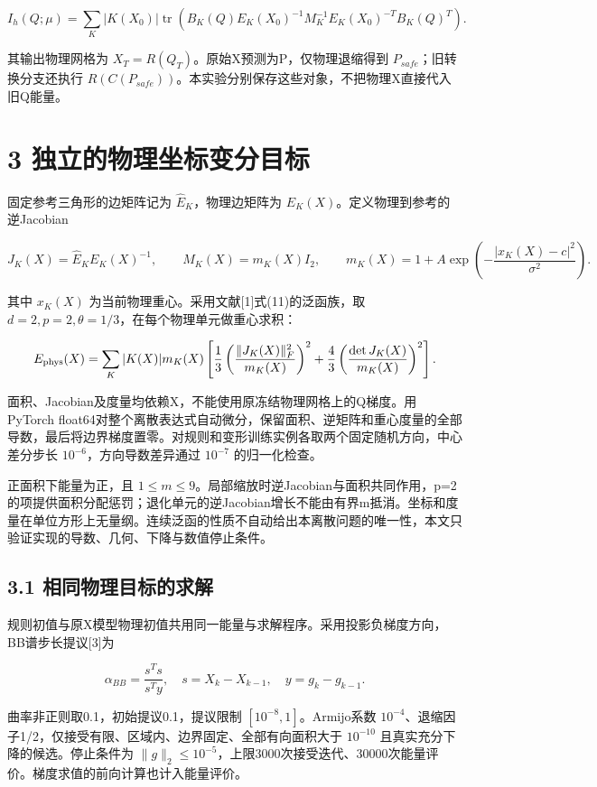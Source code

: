 \documentclass[UTF8,a4paper,zihao=5,fontset=fandol]{ctexart}
\begin{document}
\[
I_h(Q;\mu)=\sum_K |K(X_0)|\operatorname{tr}
\left(B_K(Q)E_K(X_0)^{-1}M_K^{-1}E_K(X_0)^{-T}B_K(Q)^T\right).
\]

其输出物理网格为 $X_T=R(Q_T)$。原始X预测为P，仅物理退缩得到 $P_{safe}$；旧转换分支还执行 $R(C(P_{safe}))$。本实验分别保存这些对象，不把物理X直接代入旧Q能量。



\newpage

\section*{3 独立的物理坐标变分目标}

固定参考三角形的边矩阵记为 $\widehat E_K$，物理边矩阵为 $E_K(X)$。定义物理到参考的逆Jacobian


\[
J_K(X)=\widehat E_KE_K(X)^{-1},\qquad
M_K(X)=m_K(X)I_2,\qquad
m_K(X)=1+A\exp\left(-\frac{|x_K(X)-c|^2}{\sigma^2}\right).
\]

其中 $x_K(X)$ 为当前物理重心。采用文献[1]式(11)的泛函族，取 $d=2,p=2,\theta=1/3$，在每个物理单元做重心求积：


\[
E_{\rm phys}(X)=\sum_K |K(X)|m_K(X)\left[
\frac13\left(\frac{\|J_K(X)\|_F^2}{m_K(X)}\right)^2+
\frac43\left(\frac{\det J_K(X)}{m_K(X)}\right)^2\right].
\]

面积、Jacobian及度量均依赖X，不能使用原冻结物理网格上的Q梯度。用PyTorch float64对整个离散表达式自动微分，保留面积、逆矩阵和重心度量的全部导数，最后将边界梯度置零。对规则和变形训练实例各取两个固定随机方向，中心差分步长 $10^{-6}$，方向导数差异通过 $10^{-7}$ 的归一化检查。


正面积下能量为正，且 $1\le m\le9$。局部缩放时逆Jacobian与面积共同作用，p=2的项提供面积分配惩罚；退化单元的逆Jacobian增长不能由有界m抵消。坐标和度量在单位方形上无量纲。连续泛函的性质不自动给出本离散问题的唯一性，本文只验证实现的导数、几何、下降与数值停止条件。


\subsection*{3.1 相同物理目标的求解}

规则初值与原X模型物理初值共用同一能量与求解程序。采用投影负梯度方向，BB谱步长提议[3]为


\[
\alpha_{BB}=\frac{s^Ts}{s^Ty},\quad
s=X_k-X_{k-1},\quad y=g_k-g_{k-1}.
\]

曲率非正则取0.1，初始提议0.1，提议限制 $[10^{-8},1]$。Armijo系数 $10^{-4}$、退缩因子1/2，仅接受有限、区域内、边界固定、全部有向面积大于 $10^{-10}$ 且真实充分下降的候选。停止条件为 $\|g\|_2\le10^{-5}$，上限3000次接受迭代、30000次能量评价。梯度求值的前向计算也计入能量评价。
\end{document}
